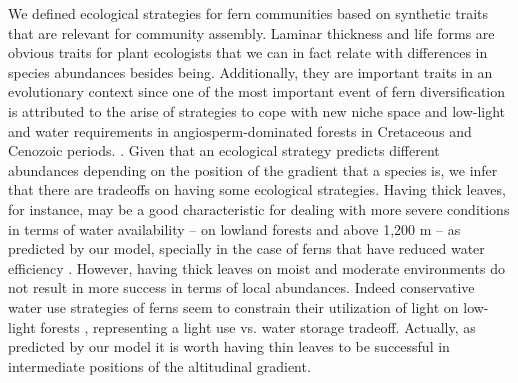 \documentclass[12pt]{article}
\begin{document}
We defined ecological strategies for fern
communities based on synthetic traits that are relevant for community
assembly. 
Laminar thickness and life forms are obvious traits for
plant ecologists that we can in fact relate with differences in species
abundances besides being. %
Additionally,
they are important traits in an evolutionary context since one of the most important event
of fern diversification is attributed to the arise of strategies to cope with
new niche space and low-light and water requirements in angiosperm-dominated forests in Cretaceous and
Cenozoic periods. 
\citep{Schneider2004, Schuettpelz2009}.
Given that an ecological strategy predicts
different abundances depending on the position of the gradient that a
species is, we infer that there are tradeoffs on having some
ecological strategies. Having thick leaves, for instance, may be a
good
characteristic for dealing with more severe conditions in terms of
water availability -- on lowland forests and above 1,200 m -- as
predicted by our model, specially in the case of ferns that have
reduced water efficiency \citep{Page2002,
Watkins2012,Vasco2013}. However, having thick leaves on moist and
moderate environments do not result in more success in terms of local
abundances. 
Indeed conservative water use strategies of ferns seem to
constrain their utilization of light on low-light forests
\citep{Zhang2009}, representing a light use vs. water storage tradeoff.
Actually, as predicted by our model it is worth having thin leaves to
be successful in intermediate positions of the altitudinal
gradient. 
\end{document}
